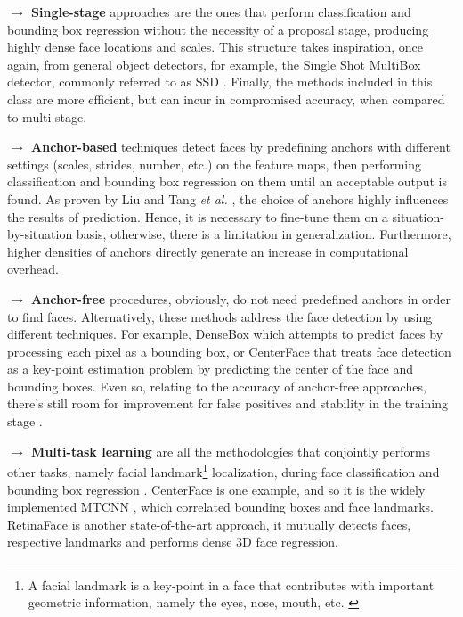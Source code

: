 \documentclass[class=report, crop=false, a4paper, 12pt]{standalone}
\begin{document}
\vspace{0.7\baselineskip}
\noindent\textbf{$\rightarrow$ Single-stage} approaches \autocite{dengRetinaFaceSinglestageDense2019} are the ones that perform classification and bounding box regression without the necessity of a proposal stage, producing highly dense face locations and scales. This structure takes inspiration, once again, from general object detectors, for example, the Single Shot MultiBox detector, commonly referred to as SSD \autocite{liuSSDSingleShot2016}. Finally, the methods included in this class are more efficient, but can incur in compromised accuracy, when compared to multi-stage.

\vspace{0.7\baselineskip}
\noindent\textbf{$\rightarrow$ Anchor-based} techniques \autocite{liuHAMBoxDelvingOnline2019, dengRetinaFaceSinglestageDense2019, zhangFaceDetectionUsing2018} detect faces by predefining anchors with different settings (scales, strides, number, etc.) on the feature maps, then performing classification and bounding box regression on them until an acceptable output is found. As proven by Liu and Tang \textit{et al.} \autocite{liuHAMBoxDelvingOnline2019}, the choice of anchors highly influences the results of prediction. Hence, it is necessary to fine-tune them on a situation-by-situation basis, otherwise, there is a limitation in generalization. Furthermore, higher densities of anchors directly generate an increase in computational overhead.

\vspace{0.7\baselineskip}
\noindent\textbf{$\rightarrow$ Anchor-free} procedures, obviously, do not need predefined anchors in order to find faces. Alternatively, these methods address the face detection by using different techniques. For example, DenseBox \autocite{huangDenseBoxUnifyingLandmark2015} which attempts to predict faces by processing each pixel as a bounding box, or CenterFace \autocite{xuCenterFaceJointFace2019} that treats face detection as a key-point estimation problem by predicting the center of the face and bounding boxes. Even so, relating to the accuracy of anchor-free approaches, there's still room for improvement for false positives and stability in the training stage \autocite{duElementsEndtoendDeep2022}.

\vspace{0.7\baselineskip}
\label{mt learning}
\noindent\textbf{$\rightarrow$ Multi-task learning} are all the methodologies that conjointly performs other tasks, namely facial landmark\footnote{A facial landmark is a key-point in a face that contributes with important geometric information, namely the eyes, nose, mouth, etc. \autocite{fengWingLossRobust2018}} localization, during face classification and bounding box regression \autocite{duElementsEndtoendDeep2022}. CenterFace \autocite{xuCenterFaceJointFace2019} is one example, and so it is the widely implemented MTCNN \autocite{zhangJointFaceDetection2016a}, which correlated bounding boxes and face landmarks. RetinaFace \autocite{dengRetinaFaceSinglestageDense2019} is another state-of-the-art approach, it mutually detects faces, respective landmarks and performs dense 3D face regression.
\end{document}
